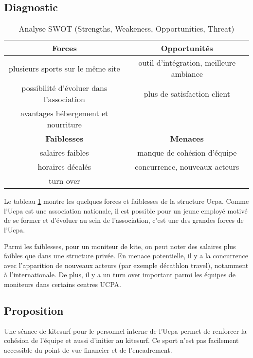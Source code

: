 \documentclass[11pt,a4paper]{report}
\begin{document}
\subsection{Diagnostic}
\begin{table}[h]
\centering
\begin{tabular}{|c|c|}
        \hline
        \textbf{Forces}                          & \textbf{Opportunités} \\ 
        \hline
        plusieurs sports sur le m\^eme site      &  outil d'intégration, meilleure ambiance\\
        possibilité d'évoluer dans l'association & plus de satisfaction client  \\
        avantages hébergement et nourriture      &                              \\
        \hline
        \textbf{Faiblesses}                      &  \textbf{Menaces} \\ 
        \hline
        salaires faibles                         & manque de cohésion d'équipe \\
        horaires décalés                         & concurrence, nouveaux acteurs   \\
        turn over                                &                               \\
        \hline
\end{tabular}
\caption{Analyse SWOT (Strengths, Weakeness, Opportunities, Threat)\label{swot}}
\end{table}
Le tableau \ref{swot} montre les quelques forces et faiblesses de la 
structure Ucpa. Comme l'Ucpa est une association nationale, il est 
possible pour un jeune employé motivé de se former et d'évoluer
au sein de l'association, c'est une des grandes forces de l'Ucpa.
 
Parmi les faiblesses, pour un moniteur de kite, on peut noter des
salaires plus faibles que dans une structure privée. 
En menace potentielle, il y a  la concurrence avec 
l’apparition de nouveaux acteurs (par exemple décathlon travel),
notamment à l'internationale. De plus, il  y a un turn over
important parmi les équipes  de moniteurs dans certains centres UCPA.

\subsection{Proposition}

Une séance de kitesurf pour le personnel interne de l'Ucpa 
permet de renforcer la cohésion de l'équipe et aussi d'initier au kitesurf.
Ce sport n'est pas facilement  accessible du point de vue financier et
de l'encadrement.
\end{document}

